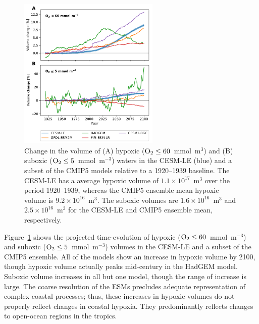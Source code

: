 \documentclass[draft,linenumbers]{report_chapter}
\begin{document}
\begin{figure}[tbp]
\centering
\includegraphics[width=0.6\textwidth]{volume-census.pdf}
\caption{Change in the volume of (A) hypoxic ($\ce{O2}\le60$~mmol~m$^{3}$) and (B) suboxic ($\ce{O2}\le5$~mmol~m$^{-3}$) waters in the CESM-LE (blue) and a subset of the CMIP5 models relative to a 1920--1939 baseline.
The CESM-LE has a average hypoxic volume of ${1.1\times10^{17}}$~m$^{3}$ over the period 1920--1939, whereas the CMIP5 ensemble mean hypoxic volume is ${9.2\times10^{16}}$~m$^{3}$.
The suboxic volumes are ${1.6\times10^{16}}$~m$^{3}$ and ${2.5\times10^{16}}$~m$^{3}$ for the CESM-LE and CMIP5 ensemble mean, respectively.
}
\label{fig:volumes}
\end{figure}

Figure~\ref{fig:volumes} shows the projected time-evolution of hypoxic ($\ce{O2}\le60$~mmol~m$^{-3}$) and suboxic ($\ce{O2}\le5$~mmol~m$^{-3}$) volumes in the CESM-LE and a subset of the CMIP5 ensemble.
All of the models show an increase in hypoxic volume by 2100, though hypoxic volume actually peaks mid-century in the HadGEM model.
Suboxic volume increases in all but one model, though the range of increase is large.
The coarse resolution of the ESMs precludes adequate representation of complex coastal processes; thus, these increases in hypoxic volumes do not properly reflect changes in coastal hypoxia.
They predominantly reflects changes to open-ocean regions in the tropics.
\end{document}

